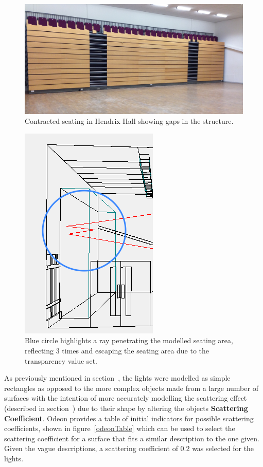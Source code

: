 \documentclass[../../main.tex]{subfiles}
\begin{document}
			\begin{figure}[h]
				\centerline{\includegraphics[scale = 0.12]{Sections/Implementation/Odeon/images/seating.jpg}}
				\caption{Contracted seating in Hendrix Hall showing gaps in the structure.}
				\label{seating}
			\end{figure}

			\begin{figure}[h]
				\center\includegraphics[scale = 0.7]{Sections/Implementation/Odeon/images/OdeonRays/transparencyEdit/singleRay2_edit3.PNG}
				\caption{Blue circle highlights a ray penetrating the modelled seating area, reflecting 3 times and escaping the seating area due to the transparency value set.}
				\label{transparency}
			\end{figure}

			As previously mentioned in section~, the lights were modelled as simple rectangles as opposed to the more complex objects made from a large number of surfaces with the intention of more accurately modelling the scattering effect (described in section~) due to their shape by altering the objects \textbf{Scattering Coefficient}. Odeon provides a table of initial indicators for possible scattering coefficients, shown in figure~\ref{odeonTable} which can be used to select the scattering coefficient for a surface that fits a similar description to the one given. Given the vague descriptions, a scattering coefficient of 0.2 was selected for the lights.
\end{document}
